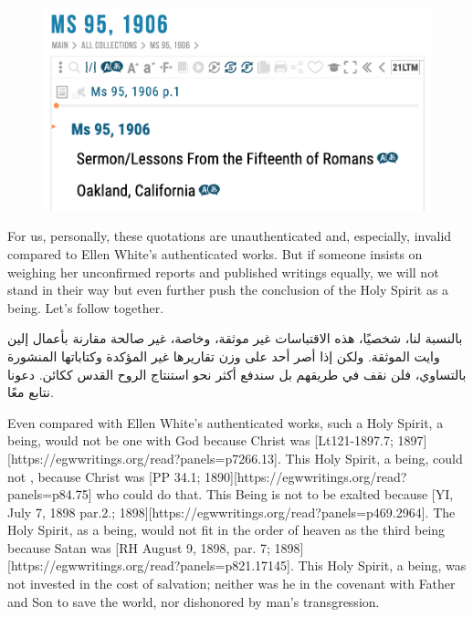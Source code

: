 \begin{figure}
    \centering
    \includegraphics[width=1\linewidth]{images/sermons-and-talks.png}
    \label{fig:enter-label}
\end{figure}


For us, personally, these quotations are unauthenticated and, especially, invalid compared to Ellen White’s authenticated works. But if someone insists on weighing her unconfirmed reports and published writings equally, we will not stand in their way but even further push the conclusion of the Holy Spirit as a being. Let’s follow together.


بالنسبة لنا، شخصيًا، هذه الاقتباسات غير موثقة، وخاصة، غير صالحة مقارنة بأعمال إلين وايت الموثقة. ولكن إذا أصر أحد على وزن تقاريرها غير المؤكدة وكتاباتها المنشورة بالتساوي، فلن نقف في طريقهم بل سندفع أكثر نحو استنتاج الروح القدس ككائن. دعونا نتابع معًا.


Even compared with Ellen White’s authenticated works, such a Holy Spirit, a being, would not be one with God because Christ was [Lt121-1897.7; 1897][https://egwwritings.org/read?panels=p7266.13]. This Holy Spirit, a being, could not , because Christ was [PP 34.1; 1890][https://egwwritings.org/read?panels=p84.75] who could do that. This Being is not to be exalted because [YI, July 7, 1898 par.2.; 1898][https://egwwritings.org/read?panels=p469.2964]. The Holy Spirit, as a being, would not fit in the order of heaven as the third being because Satan was [RH August 9, 1898, par. 7; 1898][https://egwwritings.org/read?panels=p821.17145]. This Holy Spirit, a being, was not invested in the cost of salvation; neither was he in the covenant with Father and Son to save the world, nor dishonored by man’s transgression.


